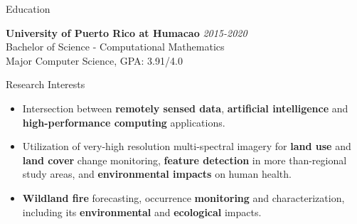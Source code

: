 \documentclass{resume} %
\begin{document}

\begin{rSection}{Education}

{\bf University of Puerto Rico at Humacao} \hfill {\em 2015-2020} \\ 
Bachelor of Science - Computational Mathematics \\
Major Computer Science, GPA: 3.91/4.0 \smallskip \\
\end{rSection}

\begin{rSection}{Research Interests}
\begin{itemize}
\item Intersection between \textbf{remotely sensed data}, \textbf{artificial intelligence} and \textbf{high-performance computing} applications. 
\item Utilization of very-high resolution multi-spectral imagery for \textbf{land use} and \textbf{land cover} change monitoring, \textbf{feature detection} in more than-regional study areas,  and \textbf{environmental impacts} on human health.
\item \textbf{Wildland fire} forecasting, occurrence \textbf{monitoring} and characterization, including its \textbf{environmental} and \textbf{ecological} impacts.
\end{itemize}
\end{rSection}

\end{document}
